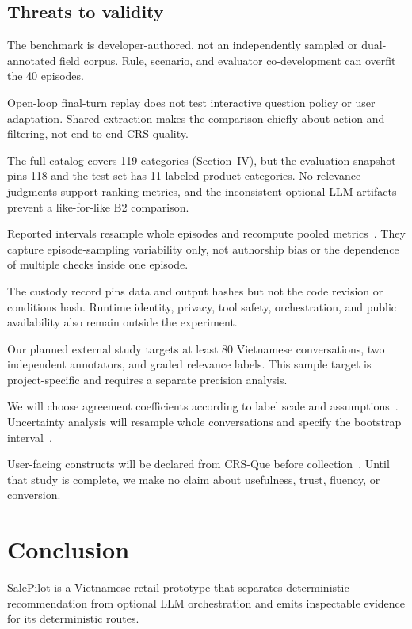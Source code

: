 \documentclass[conference,a4paper]{IEEEtran}
\begin{document}
\subsection{Threats to validity}
The benchmark is developer-authored, not an independently sampled or dual-annotated field corpus. Rule, scenario, and evaluator co-development can overfit the 40 episodes.

Open-loop final-turn replay does not test interactive question policy or user adaptation. Shared extraction makes the comparison chiefly about action and filtering, not end-to-end CRS quality.

The full catalog covers 119 categories (Section~IV), but the evaluation snapshot pins 118 and the test set has 11 labeled product categories. No relevance judgments support ranking metrics, and the inconsistent optional LLM artifacts prevent a like-for-like B2 comparison.

Reported intervals resample whole episodes and recompute pooled metrics~\cite{efron1979bootstrap}. They capture episode-sampling variability only, not authorship bias or the dependence of multiple checks inside one episode.

The custody record pins data and output hashes but not the code revision or conditions hash. Runtime identity, privacy, tool safety, orchestration, and public availability also remain outside the experiment.

Our planned external study targets at least 80 Vietnamese conversations, two independent annotators, and graded relevance labels. This sample target is project-specific and requires a separate precision analysis.

We will choose agreement coefficients according to label scale and assumptions~\cite{artstein2008agreement}. Uncertainty analysis will resample whole conversations and specify the bootstrap interval~\cite{efron1979bootstrap}.

User-facing constructs will be declared from CRS-Que before collection~\cite{jin2024crsque}. Until that study is complete, we make no claim about usefulness, trust, fluency, or conversion.

\section{Conclusion}
SalePilot is a Vietnamese retail prototype that separates deterministic recommendation from optional LLM orchestration and emits inspectable evidence for its deterministic routes.
\end{document}
